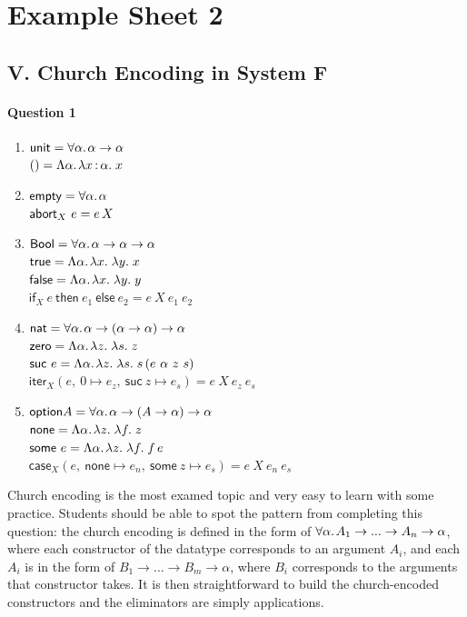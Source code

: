 \documentclass[11pt,a4paper,twoside]{article}
\begin{document}
\section*{Example Sheet 2}

\subsection*{V. Church Encoding in System F}

\paragraph*{Question 1} 

\begin{enumerate}[label=(\alph*)]
  \item $\mathsf{unit} = \forall \alpha .\;\! \alpha \to \alpha$\\
    $() = \Lambda \alpha .\;\! \lambda x \,{:}\, \alpha .\; x$ 
  \item $\mathsf{empty} = \forall \alpha .\;\! \alpha$\\
    $\mathsf{abort}_X\ e = e \, X$
  \item $\mathsf{Bool} = \forall \alpha .\;\! \alpha \to \alpha \to \alpha$\\
    $\mathsf{true} = \Lambda \alpha .\;\! \lambda x.\; \lambda y.\; x$\\ 
    $\mathsf{false} = \Lambda \alpha .\;\! \lambda x.\; \lambda y.\; y$\\ 
    $\mathsf{if}_X\ e\ \mathsf{then}\ e_1\ \mathsf{else}\ {e_2} = e\ X\ e_1\ e_2$ 
  \item $\mathsf{nat} = \forall \alpha .\;\! \alpha \to (\alpha \to \alpha) \to \alpha$\\
    $\mathsf{zero} = \Lambda \alpha .\;\! \lambda z.\; \lambda s.\; z$\\ 
    $\mathsf{suc}\ e = \Lam{\alpha}{\ulam{z}{\ulam{s}{\app{s}{(e\ \alpha\ z\ s)}}}}$\\ 
    $\mathsf{iter}_X(e,\ 0 \mapsto e_z,\ \mathsf{suc}\ z \mapsto e_s) = e\ X\ e_z\ e_s$    
  \item $\mathsf{option} A = \forall \alpha .\;\! \alpha \to (A \to \alpha) \to \alpha$\\
    $\mathsf{none} = \Lambda \alpha .\;\! \lambda z.\; \lambda f.\; z$\\ 
    $\mathsf{some}\ e = \Lambda \alpha .\;\! \lambda z.\; \lambda f.\; f \, e$\\ 
    $\mathsf{case}_X(e,\ \mathsf{none} \mapsto e_n,\ \mathsf{some}\ z \mapsto e_s) = e\ X\ e_n\ e_s$    
\end{enumerate}
%
Church encoding is the most examed topic and very easy to learn with some practice.
Students should be able to spot the pattern from completing this question: 
the church encoding is defined in the form of
$\forall \alpha .\;\! A_1 \to ... \to A_n \to \alpha$, where each constructor of the datatype 
corresponds to an argument $A_i$, and each $A_i$ is in the form of $B_1 \to ... \to B_m \to \alpha$,
where $B_i$ corresponds to the arguments that constructor takes. 
It is then straightforward to build the church-encoded constructors and the eliminators
are simply applications.
\end{document}
